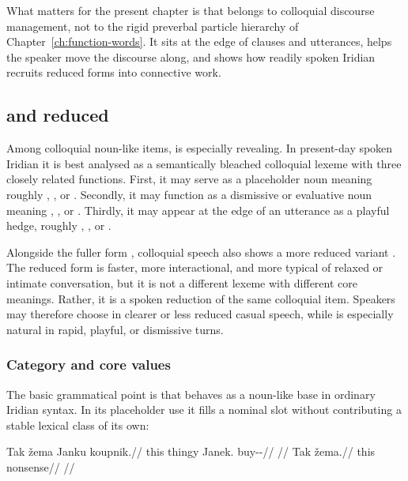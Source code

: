 What matters for the present chapter is that  belongs to colloquial
discourse management, not to the rigid preverbal particle hierarchy of
Chapter~\ref{ch:function-words}. It sits at the edge of clauses and utterances,
helps the speaker move the discourse along, and shows how readily spoken
Iridian recruits reduced forms into connective work.

\subsection{ and reduced }\label{sec:spoken-zema}

Among colloquial noun-like items,  is especially revealing. In
present-day spoken Iridian it is best analysed as a semantically bleached
colloquial lexeme with three closely related functions. First, it may serve as
a placeholder noun meaning roughly , , or
. Secondly, it may function as a dismissive or
evaluative noun meaning , , or . Thirdly, it may appear at the edge of an utterance as a playful hedge,
roughly , , or .

Alongside the fuller form , colloquial speech also shows a more
reduced variant . The reduced form is faster, more interactional, and
more typical of relaxed or intimate conversation, but it is not a different
lexeme with different core meanings. Rather, it is a spoken reduction of the
same colloquial item. Speakers may therefore choose  in clearer or
less reduced casual speech, while  is especially natural in rapid,
playful, or dismissive turns.

\subsubsection{Category and core values}

The basic grammatical point is that  behaves as a noun-like base in
ordinary Iridian syntax. In its placeholder use it fills a nominal slot without
contributing a stable lexical class of its own:

\pex
\a
\begingl
\gla Tak žema Janku koupnik.//
\glb this thingy Janek.\Trs{} buy-\Trs{}-\Pf{}//
\glft {}//
\endgl
\a
\begingl
\gla Tak žema.//
\glb this nonsense//
\glft {}//
\endgl
\xe

